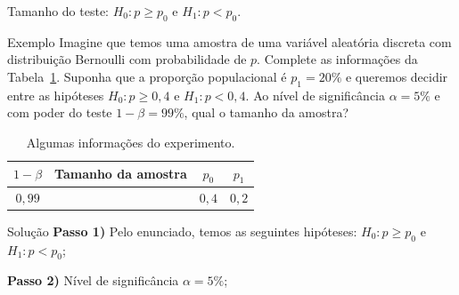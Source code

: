 \documentclass[8pt]{beamer}
\begin{document}
\begin{frame}{Tamanho do teste: $H_0: p \geq p_0$ e $H_1: p < p_0$.}


\begin{block}{Exemplo}
	Imagine que temos uma amostra de uma variável aleatória discreta com distribuição Bernoulli com probabilidade de $p$. Complete as informações da Tabela~\ref{tab:proportion-unilateral-h0-upper-sample-size}. Suponha que a proporção populacional é $p_1=20\%$ e queremos decidir entre as hipóteses $H_0: p \geq 0,4$ e $H_1:p < 0,4$. Ao nível de significância $\alpha=5\%$ e com poder do teste $1-\beta=99\%$, qual o tamanho da amostra?
	\begin{table}[ht]
		\centering
		\begin{tabular}{c|c|c|c}
			\toprule[0.05cm]
			$1-\beta$ & Tamanho da amostra & $p_0$ & $p_1$  \\ 
			\midrule
			$0,99$ &  & $0,4$ & $0,2$  \\ 
			\bottomrule[0.05cm]
		\end{tabular}
		\caption{Algumas informações do experimento.} 
		\label{tab:proportion-unilateral-h0-upper-sample-size}
	\end{table}
\end{block}

\begin{block}{Solução}
	\textbf{Passo 1)}  Pelo enunciado, temos as seguintes hipóteses: $H_0: p \geq p_0$ e $H_1: p < p_0$;
	
	\textbf{Passo 2)} Nível de significância $\alpha=5\%$;
	

\end{block}
\end{frame}
\end{document}
